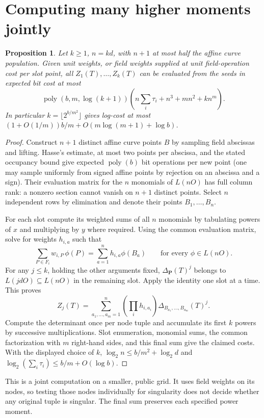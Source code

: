 \documentclass[11pt]{article}
\newtheorem{proposition}{Proposition}
\begin{document}
\section{Computing many higher moments jointly}

\begin{proposition}
Let $k\ge1$, $n=kd$, with $n+1$ at most half the affine curve population.
Given unit weights, or field weights supplied at unit field-operation cost
per slot point, all $Z_1(T),\ldots,Z_k(T)$ can be evaluated from the
seeds in expected bit cost at most
\[
 \operatorname{poly}(b,m,\log(k+1))
 \left(n\sum_i\tau_i+n^3+mn^2+kn^m\right).
\]
In particular $k=\lfloor 2^{b/m^2}\rfloor$ gives log-cost at most
$(1+O(1/m))b/m+O(m\log(m+1)+\log b)$.
\end{proposition}
\begin{proof}
Construct $n+1$ distinct affine curve points $B$ by sampling field
abscissas and lifting. Hasse's estimate, at most two points per abscissa,
and the stated occupancy bound give expected $\operatorname{poly}(b)$
bit operations per new point (one may sample uniformly from signed affine
points by rejection on an abscissa and a sign). Their evaluation matrix
for the $n$ monomials of $L(nO)$ has full column rank: a nonzero section
cannot vanish on $n+1$ distinct points. Select $n$ independent rows by
elimination and denote their points $B_1,\ldots,B_n$.

For each slot compute its weighted sums of all $n$ monomials by tabulating
powers of $x$ and multiplying by $y$ where required. Using the common
evaluation matrix, solve for weights $h_{i,a}$ such that
\[
 \sum_{P\in F_i}w_{i,P}\,\phi(P)=\sum_{a=1}^n h_{i,a}\phi(B_a)
 \qquad\text{for every }\phi\in L(nO).
\]
For any $j\le k$, holding the other arguments fixed,
$\Delta_{\mathbf P}(T)^j$ belongs to $L(jdO)\subseteq L(nO)$ in the
remaining slot. Apply the identity one slot at a time. This proves
\[
 Z_j(T)=\sum_{a_1,\ldots,a_m=1}^n
  \left(\prod_i h_{i,a_i}\right)
  \Delta_{B_{a_1},\ldots,B_{a_m}}(T)^j .
\]
Compute the determinant once per node tuple and accumulate its first
$k$ powers by successive multiplications. Slot enumeration, monomial
sums, the common factorization with $m$ right-hand sides, and this final
sum give the claimed costs. With the displayed choice of $k$,
$\log_2 n\le b/m^2+\log_2 d$ and
$\log_2(\sum_i\tau_i)\le b/m+O(\log b)$.
\end{proof}

This is a joint computation on a smaller, public grid. It uses field
weights on its nodes, so testing those nodes individually for singularity
does not decide whether any original tuple is singular. The final sum
preserves each specified power moment.
\end{document}
